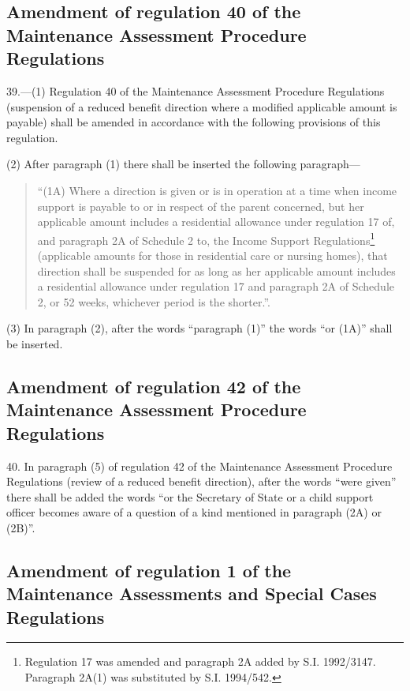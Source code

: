 \documentclass[12pt,a4paper]{article}
\begin{document}
\subsection[39. Amendment of regulation 40 of the Maintenance Assessment Procedure Regulations]{Amendment of regulation 40 of the Maintenance Assessment Procedure Regulations}

39.—(1) Regulation 40 of the Maintenance Assessment Procedure Regulations (suspension of a reduced benefit direction where a modified applicable amount is payable) shall be amended in accordance with the following provisions of this regulation.

(2) After paragraph (1) there shall be inserted the following paragraph—
\begin{quotation}
“(1A) Where a direction is given or is in operation at a time when income support is payable to or in respect of the parent concerned, but her applicable amount includes a residential allowance under regulation 17 of, and paragraph 2A of Schedule 2 to, the Income Support Regulations\footnote{\frenchspacing Regulation 17 was amended and paragraph 2A added by S.I. 1992/3147. Paragraph 2A(1) was substituted by S.I. 1994/542.} (applicable amounts for those in residential care or nursing homes), that direction shall be suspended for as long as her applicable amount includes a residential allowance under regulation 17 and paragraph 2A of Schedule 2, or 52 weeks, whichever period is the shorter.”.
\end{quotation}

(3) In paragraph (2), after the words “paragraph (1)” the words “or (1A)” shall be inserted.

\subsection[40. Amendment of regulation 42 of the Maintenance Assessment Procedure Regulations]{Amendment of regulation 42 of the Maintenance Assessment Procedure Regulations}

40.  In paragraph (5) of regulation 42 of the Maintenance Assessment Procedure Regulations (review of a reduced benefit direction), after the words “were given” there shall be added the words “or the Secretary of State or a child support officer becomes aware of a question of a kind mentioned in paragraph (2A) or (2B)”.

\subsection[41. Amendment of regulation 1 of the Maintenance Assessments and Special Cases Regulations]{\sloppy Amendment of regulation 1 of the Maintenance Assessments and Special Cases Regulations}
\end{document}
